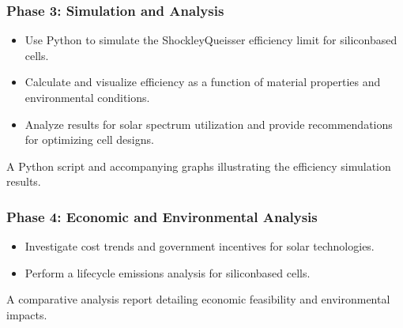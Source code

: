 \documentclass[letterpaper,10pt,english]{jupyterBook}
\begin{document}
\subsubsection{Phase 3: Simulation and Analysis}
\label{\detokenize{ProjectInstructions:phase-3-simulation-and-analysis}}
\sphinxAtStartPar
{}
\begin{itemize}
\item {} 
\sphinxAtStartPar
Use Python to simulate the Shockley\sphinxhyphen{}Queisser efficiency limit for
silicon\sphinxhyphen{}based cells.

\item {} 
\sphinxAtStartPar
Calculate and visualize efficiency as a function of material
properties and environmental conditions.

\item {} 
\sphinxAtStartPar
Analyze results for solar spectrum utilization and provide
recommendations for optimizing cell designs.

\end{itemize}

\sphinxAtStartPar
{} A Python script and accompanying graphs illustrating
the efficiency simulation results.


\subsubsection{Phase 4: Economic and Environmental Analysis}
\label{\detokenize{ProjectInstructions:phase-4-economic-and-environmental-analysis}}
\sphinxAtStartPar
{}
\begin{itemize}
\item {} 
\sphinxAtStartPar
Investigate cost trends and government incentives for solar
technologies.

\item {} 
\sphinxAtStartPar
Perform a lifecycle emissions analysis for silicon\sphinxhyphen{}based cells.

\end{itemize}

\sphinxAtStartPar
{} A comparative analysis report detailing economic
feasibility and environmental impacts.
\end{document}

